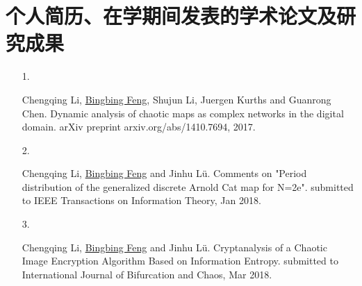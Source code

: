 ﻿\chapter*{个人简历、在学期间发表的学术论文及研究成果}
\begin{itemize}
\item[1.]

Chengqing Li, \underline{Bingbing Feng}, Shujun Li, Juergen Kurths and Guanrong Chen.
Dynamic analysis of chaotic maps as complex networks in the digital domain.
arXiv preprint arxiv.org/abs/1410.7694, 2017.

\item[2.]

Chengqing Li, \underline{Bingbing Feng} and Jinhu Lü.
Comments on "Period distribution of the generalized discrete Arnold Cat map for N=2e".
submitted to IEEE Transactions on Information Theory, Jan 2018.

\item[3.]

Chengqing Li, \underline{Bingbing Feng} and Jinhu Lü.
Cryptanalysis of a Chaotic Image Encryption Algorithm Based on Information Entropy.
submitted to International Journal of Bifurcation and Chaos, Mar 2018.

\end{itemize} 